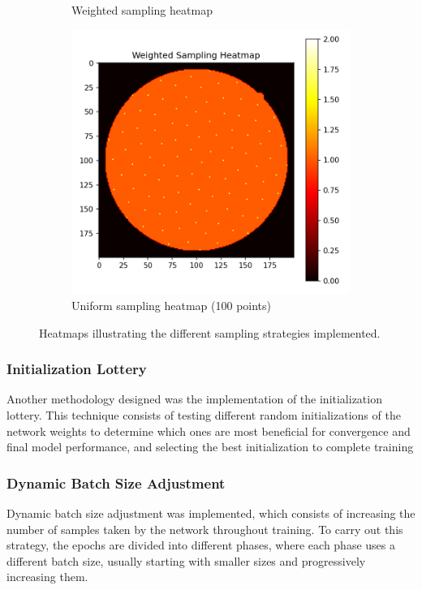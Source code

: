 \begin{figure}[tbp]
\begin{subfigure}[b]{0.3\textwidth}
        \caption{Weighted sampling heatmap}
        \label{fig:weighted_sampling_heatmap}
    \end{subfigure}
    \hfill
    \begin{subfigure}[b]{0.3\textwidth}
        \centering
        \includegraphics[width=\textwidth]{imaxes/muestraje/uniform_sampling_heatmap.png}
        \caption{Uniform sampling heatmap (100 points)}
        \label{fig:uniform_sampling_heatmap}
    \end{subfigure}
    \caption{Heatmaps illustrating the different sampling strategies implemented.}
    \label{fig:sampling_heatmaps}
\end{figure}

\subsubsection{Initialization Lottery}
\label{subsubsec:loteria_inicializacion}
Another methodology designed was the implementation of the initialization lottery. This technique consists of testing different random initializations of the network weights to determine which ones are most beneficial for convergence and final model performance, and selecting the best initialization to complete training

\subsubsection{Dynamic Batch Size Adjustment}
\label{subsubsec:axuste_dinamico_batch_size}
Dynamic batch size adjustment was implemented, which consists of increasing the number of samples taken by the network throughout training. To carry out this strategy, the epochs are divided into different phases, where each phase uses a different batch size, usually starting with smaller sizes and progressively increasing them.

